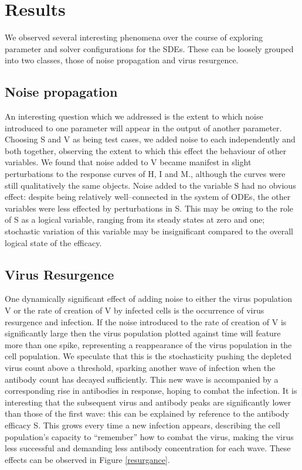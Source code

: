 \documentclass[a4paper, 12pt]{report}
\begin{document}
\section{Results}

We observed several interesting phenomena over the course of exploring parameter and solver configurations for the SDEs. These can be loosely grouped into two classes, those of noise propagation and virus resurgence.

\subsection{Noise propagation}

An interesting question which we addressed is the extent to which noise introduced to one parameter will appear in the output of another parameter. Choosing S and V as being test cases, we added noise to each independently and both together, observing the extent to which this effect the behaviour of other variables. We found that noise added to V became manifest in slight perturbations to the response curves of H, I and M., although the curves were still qualitatively the same objects. Noise added to the variable S had no obvious effect: despite being relatively well--connected in the system of ODEs, the other variables were less effected by perturbations in S. This may be owing to the role of S as a logical variable, ranging from its steady states at zero and one; stochastic variation of this variable may be insignificant compared to the overall logical state of the efficacy.

\subsection{Virus Resurgence}

One dynamically significant effect of adding noise to either the virus population V or the rate of creation of V by infected cells is the occurrence of virus resurgence and infection. If the noise introduced to the rate of creation of V is significantly large then the virus population plotted against time will feature more than one spike, representing a reappearance of the virus population in the cell population. We speculate that this is the stochasticity pushing the depleted virus count above a threshold, sparking another wave of infection when the antibody count has decayed sufficiently. This new wave is accompanied by a corresponding rise in antibodies in response, hoping to combat the infection. It is interesting that the subsequent virus and antibody peaks are significantly lower than those of the first wave: this can be explained by reference to the antibody efficacy S. This grows every time a new infection appears, describing the cell population's capacity to ``remember'' how to combat the virus, making the virus less successful and demanding less antibody concentration for each wave. These effects can be observed in Figure \ref{resurgance}.
\end{document}
